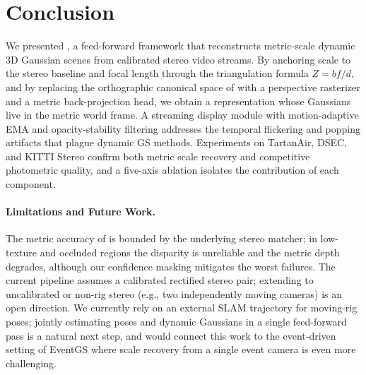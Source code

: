 \section{Conclusion}
\label{sec:conclusion}

We presented \StereoSplat, a feed-forward framework that reconstructs
metric-scale dynamic 3D Gaussian scenes from calibrated stereo video
streams. By anchoring scale to the stereo baseline and focal length
through the triangulation formula $Z = b f / d$, and by replacing the
orthographic canonical space of \StreamSplat with a perspective
rasterizer and a metric back-projection head, we obtain a representation
whose Gaussians live in the metric world frame. A streaming display
module with motion-adaptive EMA and opacity-stability filtering addresses
the temporal flickering and popping artifacts that plague dynamic GS
methods. Experiments on TartanAir, DSEC, and KITTI Stereo confirm both
metric scale recovery and competitive photometric quality, and a
five-axis ablation isolates the contribution of each component.

\paragraph{Limitations and Future Work.}
The metric accuracy of \StereoSplat is bounded by the underlying stereo
matcher; in low-texture and occluded regions the disparity is unreliable
and the metric depth degrades, although our confidence masking mitigates
the worst failures. The current pipeline assumes a calibrated rectified
stereo pair; extending to uncalibrated or non-rig stereo (e.g., two
independently moving cameras) is an open direction. We currently rely on
an external SLAM trajectory for moving-rig poses; jointly estimating
poses and dynamic Gaussians in a single feed-forward pass is a natural
next step, and would connect this work to the event-driven setting of
EventGS where scale recovery from a single event camera is even more
challenging.
